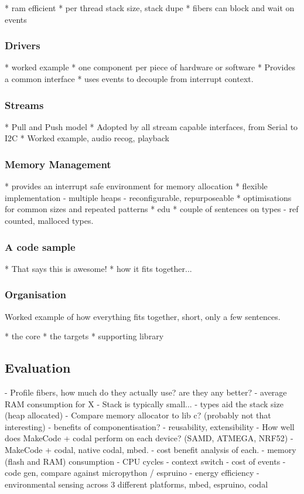 * ram efficient
* per thread stack size, stack dupe
* fibers can block and wait on events

\subsubsection{Drivers}

* worked example
* one component per piece of hardware or software
* Provides a common interface
* uses events to decouple from interrupt context.

\subsubsection{Streams}

* Pull and Push model
* Adopted by all stream capable interfaces, from Serial to I2C
* Worked example, audio recog, playback

\subsubsection{Memory Management}

* provides an interrupt safe environment for memory allocation
* flexible implementation
    - multiple heaps
    - reconfigurable, repurposeable
* optimisations for common sizes and repeated patterns
* edu
* couple of sentences on types
    - ref counted, malloced types.

\subsubsection{A code sample}

* That says this is awesome!
* how it fits together...

\subsubsection{Organisation}

Worked example of how everything fits together, short, only a few sentences.

* the core
* the targets
* supporting library


\subsection{Evaluation}

- Profile fibers, how much do they actually use? are they any better?
    - average RAM consumption for X
    - Stack is typically small...
    - types aid the stack size (heap allocated)
- Compare memory allocator to lib c? (probably not that interesting)
- benefits of componentisation?
    - reusability, extensibility
- How well does MakeCode + codal perform on each device? (SAMD, ATMEGA, NRF52)
    - MakeCode + codal, native codal, mbed.
    - cost benefit analysis of each.
    - memory (flash and RAM) consumption
    - CPU cycles
        - context switch
        - cost of events
        - code gen, compare against micropython / espruino
    - energy efficiency
        - environmental sensing across 3 different platforms, mbed, espruino, codal